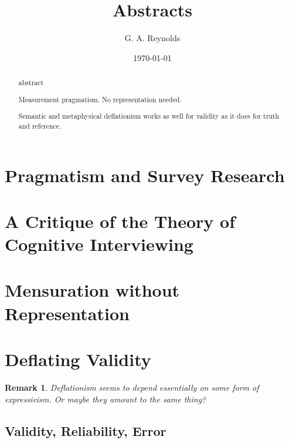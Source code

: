 \documentclass[11pt,twoside]{article}
\title{Abstracts}
\author{G. A. Reynolds}
\date{\today}
\newtheorem{remark}{Remark}
\newcommand{\SR}{Survey Research}
\begin{document}
\maketitle
\nocite{*}

\begin{abstract}
abstract
\end{abstract}

\tableofcontents
\listoffigures

\newpage
\section{Pragmatism and \SR{}}

\begin{abstract}
\end{abstract}


\section{A Critique of the Theory of Cognitive Interviewing}

\begin{abstract}
  
\end{abstract}

\section{Mensuration without Representation}

\begin{abstract}
Measurement pragmatism.  No representation needed.
\end{abstract}

\section{Deflating Validity}

\begin{abstract}
Semantic and metaphysical deflationism works as well for validity as
it does for truth and reference.
\end{abstract}

\begin{remark}
  Deflationism seems to depend essentially on some form of
  expressivism.  Or maybe they amount to the same thing?
\end{remark}

\subsection{Validity, Reliability, Error}
\label{sub:Validity}
\end{document}
